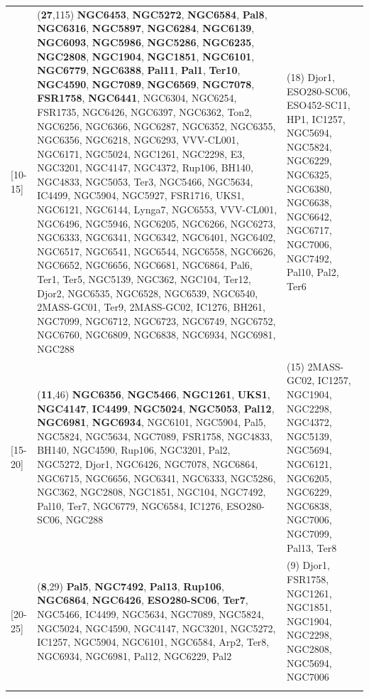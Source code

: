\begin{table}
\begin{tabularx}{\textwidth}{l X X }
        [10-15] & (\textbf{27},115) \textbf{NGC6453}, \textbf{NGC5272}, \textbf{NGC6584}, \textbf{Pal8}, \textbf{NGC6316}, \textbf{NGC5897}, \textbf{NGC6284}, \textbf{NGC6139}, \textbf{NGC6093}, \textbf{NGC5986}, \textbf{NGC5286}, \textbf{NGC6235}, \textbf{NGC2808}, \textbf{NGC1904}, \textbf{NGC1851}, \textbf{NGC6101}, \textbf{NGC6779}, \textbf{NGC6388}, \textbf{Pal11}, \textbf{Pal1}, \textbf{Ter10}, \textbf{NGC4590}, \textbf{NGC7089}, \textbf{NGC6569}, \textbf{NGC7078}, \textbf{FSR1758}, \textbf{NGC6441}, NGC6304, NGC6254, FSR1735, NGC6426, NGC6397, NGC6362, Ton2, NGC6256, NGC6366, NGC6287, NGC6352, NGC6355, NGC6356, NGC6218, NGC6293, VVV-CL001, NGC6171, NGC5024, NGC1261, NGC2298, E3, NGC3201, NGC4147, NGC4372, Rup106, BH140, NGC4833, NGC5053, Ter3, NGC5466, NGC5634, IC4499, NGC5904, NGC5927, FSR1716, UKS1, NGC6121, NGC6144, Lynga7, NGC6553, VVV-CL001, NGC6496, NGC5946, NGC6205, NGC6266, NGC6273, NGC6333, NGC6341, NGC6342, NGC6401, NGC6402, NGC6517, NGC6541, NGC6544, NGC6558, NGC6626, NGC6652, NGC6656, NGC6681, NGC6864, Pal6, Ter1, Ter5, NGC5139, NGC362, NGC104, Ter12, Djor2, NGC6535, NGC6528, NGC6539, NGC6540, 2MASS-GC01, Ter9, 2MASS-GC02, IC1276, BH261, NGC7099, NGC6712, NGC6723, NGC6749, NGC6752, NGC6760, NGC6809, NGC6838, NGC6934, NGC6981, NGC288 & (18) Djor1, ESO280-SC06, ESO452-SC11, HP1, IC1257, NGC5694, NGC5824, NGC6229, NGC6325, NGC6380, NGC6638, NGC6642, NGC6717, NGC7006, NGC7492, Pal10, Pal2, Ter6\\ 
        \vspace{0.1cm}

        [15-20] & (\textbf{11},46) \textbf{NGC6356}, \textbf{NGC5466}, \textbf{NGC1261}, \textbf{UKS1}, \textbf{NGC4147}, \textbf{IC4499}, \textbf{NGC5024}, \textbf{NGC5053}, \textbf{Pal12}, \textbf{NGC6981}, \textbf{NGC6934}, NGC6101, NGC5904, Pal5, NGC5824, NGC5634, NGC7089, FSR1758, NGC4833, BH140, NGC4590, Rup106, NGC3201, Pal2, NGC5272, Djor1, NGC6426, NGC7078, NGC6864, NGC6715, NGC6656, NGC6341, NGC6333, NGC5286, NGC362, NGC2808, NGC1851, NGC104, NGC7492, Pal10, Ter7, NGC6779, NGC6584, IC1276, ESO280-SC06, NGC288 & (15) 2MASS-GC02, IC1257, NGC1904, NGC2298, NGC4372, NGC5139, NGC5694, NGC6121, NGC6205, NGC6229, NGC6838, NGC7006, NGC7099, Pal13, Ter8\\ 
        \vspace{0.1cm}

        [20-25] & (\textbf{8},29) \textbf{Pal5}, \textbf{NGC7492}, \textbf{Pal13}, \textbf{Rup106}, \textbf{NGC6864}, \textbf{NGC6426}, \textbf{ESO280-SC06}, \textbf{Ter7}, NGC5466, IC4499, NGC5634, NGC7089, NGC5824, NGC5024, NGC4590, NGC4147, NGC3201, NGC5272, IC1257, NGC5904, NGC6101, NGC6584, Arp2, Ter8, NGC6934, NGC6981, Pal12, NGC6229, Pal2 & (9) Djor1, FSR1758, NGC1261, NGC1851, NGC1904, NGC2298, NGC2808, NGC5694, NGC7006\\ 
        \vspace{0.1cm}


\end{tabularx}
\end{table}
